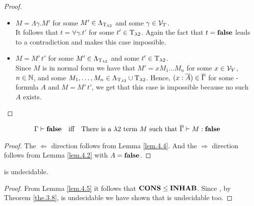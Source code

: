 \begin{proof}
\begin{itemize}
	\item[] \underline{$M=\Lambda\gamma.M'$} for some $M'\in\Lambda_{\text{T}_{\lambda2}}$ and some $\gamma\in\mathcal{V}_T$.\\ %
		It follows that $t=\forall\gamma.t'$ for some $t'\in\text{T}_{\lambda2}$. Again the fact that $t=\textbf{false}$ leads to a contradiction and makes this case impossible.
		

	\item[] \underline{$M=M'\,t'$} for some $M'\in\Lambda_{\text{T}_{\lambda2}}$ and some $t'\in\text{T}_{\lambda2}$.\\
		Since $M$ is in normal form we have that $M'=xM_1\dots M_n$ for some $x\in\mathcal{V}_V$, $n\in\mathbb{N}$, and some $M_1,\dots,M_n\in\Lambda_{\text{T}_{\lambda2}}\cup\text{T}_{\lambda2}$.
		Hence, $(x:\overline{A})\in\overline{\Gamma}$ for some \SysP-formula $A$ and $M=M'\,t'$, we get that this case is impossible because no such $A$ exists.
		
		
		
\end{itemize}
\end{proof}

\begin{lemma}\label{lem.4.5}
\begin{align*}
\Gamma\vdash\textbf{false}&&\text{iff}&&\text{There is a $\lambda2$ term $M$ such that } \overline{\Gamma}\vdash M:\textbf{false}
\end{align*}
\end{lemma}
\begin{proof}
The $\Leftarrow$ direction follows from Lemma %
\ref{lem.4.4}. And the $\Rightarrow$ direction follows from Lemma \ref{lem.4.2} with $A=\textbf{false}$.
\end{proof}

\begin{theorem}\label{the.4.6}
\lambdaInhab{} is undecidable.
\end{theorem}
\begin{proof}
From Lemma \ref{lem.4.5} it follows that $\textbf{CONS}\leq\textbf{INHAB}$. Since , by Theorem \ref{the.3.8}, \PCons{} is undecidable we have shown that \lambdaInhab{} is undecidable too.
\end{proof}